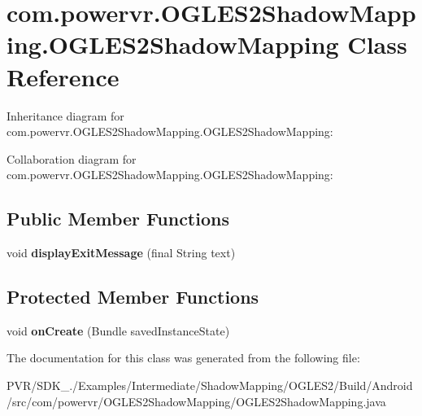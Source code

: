 \hypertarget{classcom_1_1powervr_1_1_o_g_l_e_s2_shadow_mapping_1_1_o_g_l_e_s2_shadow_mapping}{\section{com.\+powervr.\+O\+G\+L\+E\+S2\+Shadow\+Mapping.\+O\+G\+L\+E\+S2\+Shadow\+Mapping Class Reference}
\label{classcom_1_1powervr_1_1_o_g_l_e_s2_shadow_mapping_1_1_o_g_l_e_s2_shadow_mapping}
}


Inheritance diagram for com.\+powervr.\+O\+G\+L\+E\+S2\+Shadow\+Mapping.\+O\+G\+L\+E\+S2\+Shadow\+Mapping\+:


Collaboration diagram for com.\+powervr.\+O\+G\+L\+E\+S2\+Shadow\+Mapping.\+O\+G\+L\+E\+S2\+Shadow\+Mapping\+:
\subsection*{Public Member Functions}
\begin{DoxyCompactItemize}
\item 
\hypertarget{classcom_1_1powervr_1_1_o_g_l_e_s2_shadow_mapping_1_1_o_g_l_e_s2_shadow_mapping_a579781b63e65e7201fef9e2ad7bdd9fa}{void {\bfseries display\+Exit\+Message} (final String text)}\label{classcom_1_1powervr_1_1_o_g_l_e_s2_shadow_mapping_1_1_o_g_l_e_s2_shadow_mapping_a579781b63e65e7201fef9e2ad7bdd9fa}

\end{DoxyCompactItemize}
\subsection*{Protected Member Functions}
\begin{DoxyCompactItemize}
\item 
\hypertarget{classcom_1_1powervr_1_1_o_g_l_e_s2_shadow_mapping_1_1_o_g_l_e_s2_shadow_mapping_ab78f361af8fcff5d1b1772749fb829c2}{void {\bfseries on\+Create} (Bundle saved\+Instance\+State)}\label{classcom_1_1powervr_1_1_o_g_l_e_s2_shadow_mapping_1_1_o_g_l_e_s2_shadow_mapping_ab78f361af8fcff5d1b1772749fb829c2}

\end{DoxyCompactItemize}


The documentation for this class was generated from the following file\+:\begin{DoxyCompactItemize}
\item 
P\+V\+R/\+S\+D\+K\+\_./\+Examples/\+Intermediate/\+Shadow\+Mapping/\+O\+G\+L\+E\+S2/\+Build/\+Android/src/com/powervr/\+O\+G\+L\+E\+S2\+Shadow\+Mapping/O\+G\+L\+E\+S2\+Shadow\+Mapping.\+java\end{DoxyCompactItemize}
